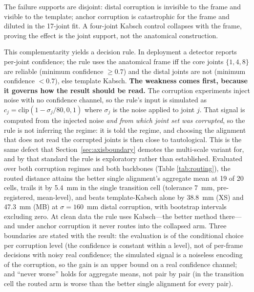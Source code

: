 \documentclass[12pt,a4paper]{report}
\begin{document}
The failure supports are disjoint: distal corruption is invisible to the frame and visible to the template; anchor corruption is catastrophic for the frame and diluted in the 17-joint fit. A four-joint Kabsch control collapses with the frame, proving the effect is the joint support, not the anatomical construction.

This complementarity yields a decision rule. In deployment a detector reports per-joint confidence; the rule uses the anatomical frame iff the core joints $\{1, 4, 8\}$ are reliable (minimum confidence $\ge 0.7$) and the distal joints are not (minimum confidence $< 0.7$), else template Kabsch. \textbf{The weakness comes first, because it governs how the result should be read.} The corruption experiments inject noise with no confidence channel, so the rule's input is simulated as $c_j = \mathrm{clip}(1 - \sigma_j/80, 0, 1)$ where $\sigma_j$ is the noise applied to joint $j$. That signal is computed from the injected noise \emph{and from which joint set was corrupted}, so the rule is not inferring the regime: it is told the regime, and choosing the alignment that does not read the corrupted joints is then close to tautological. This is the same defect that Section~\ref{sec:axisboundary} demotes the multi-scale variant for, and by that standard the rule is exploratory rather than established. Evaluated over both corruption regimes and both backbones (Table \ref{tab:routing}), the routed distance attains the better single alignment's aggregate mean at 19 of 20 cells, trails it by 5.4~mm in the single transition cell (tolerance 7~mm, pre-registered, mean-level), and beats template-Kabsch alone by 38.8~mm (XS) and 47.3~mm (MB) at $\sigma = 160$~mm distal corruption, with bootstrap intervals excluding zero. At clean data the rule uses Kabsch---the better method there---and under anchor corruption it never routes into the collapsed arm. Three boundaries are stated with the result: the evaluation is of the conditional choice per corruption level (the confidence is constant within a level), not of per-frame decisions with noisy real confidence; the simulated signal is a noiseless encoding of the corruption, so the gain is an upper bound on a real confidence channel; and ``never worse'' holds for aggregate means, not pair by pair (in the transition cell the routed arm is worse than the better single alignment for every pair).
\end{document}
